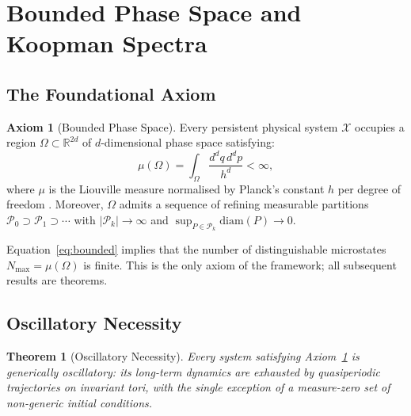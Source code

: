 \documentclass[11pt,twocolumn,a4paper]{article}
\newtheorem{theorem}{Theorem}[section]
\theoremstyle{definition}
\newtheorem{axiom}{Axiom}
\theoremstyle{remark}
\begin{document}
\section{Bounded Phase Space and Koopman Spectra}
\label{sec:bps}

\subsection{The Foundational Axiom}

\begin{axiom}[Bounded Phase Space]
\label{ax:bps}
Every persistent physical system $\mathcal{X}$ occupies a region
$\Omega \subset \mathbb{R}^{2d}$ of $d$-dimensional phase space satisfying:
\begin{equation}
\mu(\Omega) = \int_\Omega \frac{d^d q\, d^d p}{h^d} < \infty,
\label{eq:bounded}
\end{equation}
where $\mu$ is the Liouville measure normalised by Planck's constant $h$ per
degree of freedom \citep{planck1901, heisenberg1927}. Moreover, $\Omega$ admits
a sequence of refining measurable partitions $\mathscr{P}_0 \supset \mathscr{P}_1
\supset \cdots$ with $|\mathscr{P}_k| \to \infty$ and
$\sup_{P \in \mathscr{P}_k} \mathrm{diam}(P) \to 0$.
\end{axiom}

\noindent Equation~\eqref{eq:bounded} implies that the number of
distinguishable microstates $N_{\max} = \mu(\Omega)$ is finite. This is the
only axiom of the framework; all subsequent results are theorems.

\subsection{Oscillatory Necessity}

\begin{theorem}[Oscillatory Necessity]
\label{thm:osc}
Every system satisfying Axiom~\ref{ax:bps} is generically oscillatory:
its long-term dynamics are exhausted by quasiperiodic trajectories on invariant
tori, with the single exception of a measure-zero set of non-generic initial
conditions.
\end{theorem}
\end{document}
